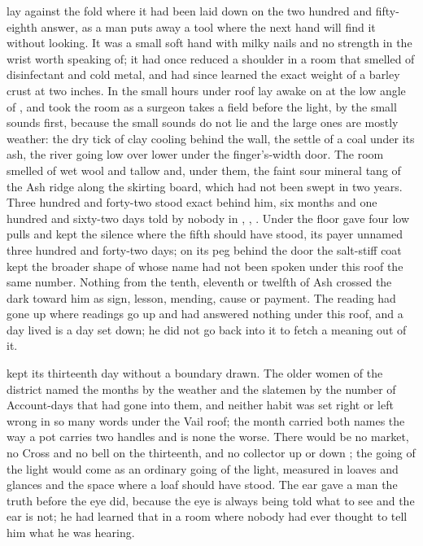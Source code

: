 
 lay against the fold where it had been laid down on the two hundred and fifty-eighth answer, as a man puts away a tool where the next hand will find it without looking. It was a small soft hand with milky nails and no strength in the wrist worth speaking of; it had once reduced a shoulder in a room that smelled of disinfectant and cold metal, and had since learned the exact weight of a barley crust at two inches. In the small hours under  roof  lay awake on  at the low angle of , and took the room as a surgeon takes a field before the light, by the small sounds first, because the small sounds do not lie and the large ones are mostly weather: the dry tick of clay cooling behind the wall, the settle of a coal under its ash, the river going low over lower under the finger's-width door. The room smelled of wet wool and tallow and, under them, the faint sour mineral tang of the Ash ridge along the skirting board, which had not been swept in two years. Three hundred and forty-two stood exact behind him, six months and one hundred and sixty-two days told by nobody in , , . Under the floor  gave four low pulls and kept the silence where the fifth should have stood, its payer unnamed three hundred and forty-two days; on its peg behind the door the salt-stiff coat kept the broader shape of  whose name had not been spoken under this roof the same number. Nothing from the tenth, eleventh or twelfth of Ash crossed the dark toward him as sign, lesson, mending, cause or payment. The reading had gone up where readings go up and had answered nothing under this roof, and a day lived is a day set down; he did not go back into it to fetch a meaning out of it.

 kept its thirteenth day without a boundary drawn. The older women of the district named the months by the weather and the slatemen by the number of Account-days that had gone into them, and neither habit was set right or left wrong in so many words under the Vail roof; the month carried both names the way a pot carries two handles and is none the worse. There would be no market, no Cross and no bell on the thirteenth, and no collector up or down ; the going of the light would come as an ordinary going of the light, measured in loaves and glances and the space where a loaf should have stood. The ear gave a man the truth before the eye did, because the eye is always being told what to see and the ear is not; he had learned that in a room where nobody had ever thought to tell him what he was hearing.

